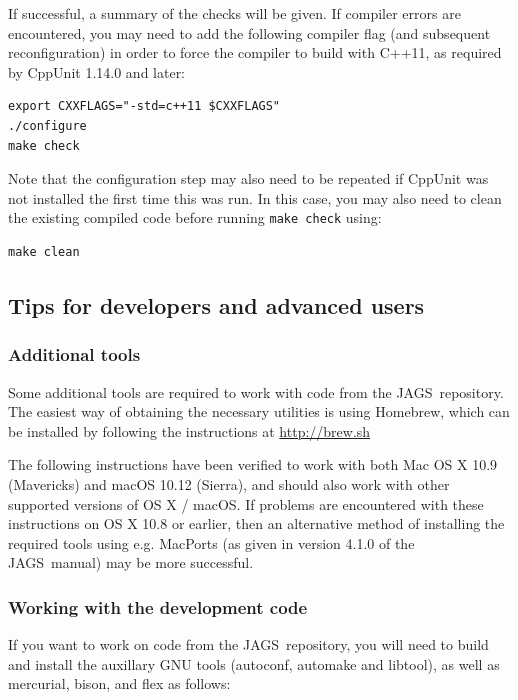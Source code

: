 \documentclass[11pt, a4paper, titlepage]{article}
\newcommand{\JAGS}{\textsf{JAGS}}
\begin{document}
If successful, a summary of the checks will be given.  If compiler errors are encountered, 
you may need to add the following compiler flag (and subsequent reconfiguration) in order to force 
the compiler to build with C++11, as required by CppUnit 1.14.0 and later:

\begin{verbatim} 
export CXXFLAGS="-std=c++11 $CXXFLAGS"
./configure
make check
\end{verbatim}

Note that the configuration step may also need to be repeated if CppUnit 
was not installed the first time this was run.  In this case, you may 
also need to clean the existing compiled code before running \texttt{make check} using:

\begin{verbatim} 
make clean
\end{verbatim} 



\subsection{Tips for developers and advanced users}

\subsubsection{Additional tools}
\label{section:osxtools}

Some additional tools are required to work with code from the \JAGS\ repository.
The easiest way of obtaining the necessary utilities is using Homebrew,
which can be installed by following the instructions at \url{http://brew.sh}

The following instructions have been verified to work with both Mac OS X 10.9 
(Mavericks) and macOS 10.12 (Sierra), and should also work with other
supported versions of OS X / macOS.  If problems are encountered with
these instructions on OS X 10.8 or earlier, then an alternative method
of installing the required tools using e.g. MacPorts (as given in version 4.1.0 of 
the \JAGS\ manual) may be more successful.

\subsubsection{Working with the development code}

If you want to work on code from the \JAGS\ repository, you will need to
build and install the auxillary GNU tools (autoconf, automake and
libtool), as well as mercurial, bison, and flex as follows:
\end{document}
